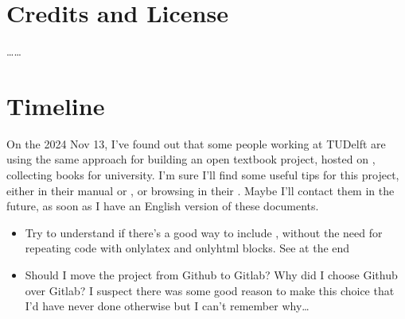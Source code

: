 \documentclass[letterpaper,10pt,italian]{jupyterBook}
\begin{document}
\section{Credits and License}
\label{\detokenize{ch/about:credits-and-license}}
\sphinxAtStartPar
……


\section{Timeline}
\label{\detokenize{ch/about:timeline}}
\sphinxAtStartPar
{}

\sphinxAtStartPar
{}
On the 2024 Nov 13, I’ve found out that some people working at TUDelft are using the same approach for building an open textbook project, hosted on , collecting books for university. I’m sure I’ll find some useful tips for this project, either in their manual or , or browsing in their .
Maybe I’ll contact them in the future, as soon as I have an English version of these documents.
\begin{itemize}
\item {} 
\sphinxAtStartPar
Try to understand if there’s a good way to include , without the need for repeating code with only\sphinxhyphen{}latex and only\sphinxhyphen{}html blocks. See at the end 

\item {} 
\sphinxAtStartPar
Should I move the project from Github to Gitlab? Why did I choose Github over Gitlab? I suspect there was some good reason to make this choice \sphinxhyphen{} that I’d have never done otherwise \sphinxhyphen{} but I can’t remember why…

\end{itemize}







\renewcommand{\indexname}{Indice}
\printindex
\end{document}
